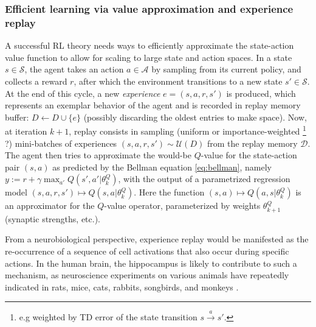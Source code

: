 \documentclass[10pt,letterpaper]{article}
\begin{document}
\subsubsection{Efficient learning via value approximation and experience replay}
A successful RL theory needs ways to efficiently approximate the state-action value function
to allow for scaling to large state and action spaces.
In a state $s \in \mathcal S$, the agent takes an action $a \in \mathcal A$
by sampling from its current policy, and collects a reward $r$,
after which the environment transitions to a new state $s' \in \mathcal S$.
At the end of this cycle, a new \textit{experience} $e = (s,a,r,s')$ is produced, which represents an exemplar
behavior of the agent and is recorded in replay memory buffer:
$D \leftarrow D \cup \{e\}$ (possibly discarding the oldest entries to make space).
Now, at iteration $k+1$, replay consists in sampling (uniform or importance-weighted
\footnote{e.g weighted by TD error of the state transition $s \overset{a}{\rightarrow} s'$.} ?)  mini-batches of experiences
$(s, a, r, s') \sim \mathcal U(D)$ from the replay memory $\mathcal D$.
The agent then tries to approximate
the would-be $Q$-value for the state-action pair $(s,a)$ as predicted by the Bellman equation \eqref{eq:bellman}, namely
$y := r + \gamma \max_{a'} Q(s', a'|\theta^Q_k)$, with the output of a parametrized regression model $(s,a,r,s')
\mapsto {Q}(s, a|\theta^Q_{k})$. Here the function $(s,a) \mapsto Q(a,s|\theta^Q_{k})$
is an approximator for the $Q$-value operator,  parameterized by weights $\theta^Q_{k+1}$
(synaptic strengths, etc.).

From a neurobiological perspective,
experience replay would be manifested as the re-occurrence of a sequence of cell activations that also occur during specific actions.
In the human brain, the hippocampus is likely to contribute to such a mechanism,
as neuroscience experiments on various animals have repeatedly indicated
in rats, mice, cats, rabbits, songbirds, and
monkeys \cite{buhry2011,nokia2010,dave2000,skaggs2007}.
\end{document}
